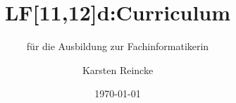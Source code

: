 \documentclass[]{beamer}
\title{LF[11,12]d:Curriculum}
\subtitle{für die Ausbildung zur Fachinformatikerin}
\institute{GS-LDK}
\author{Karsten Reincke}
\date{\today}
\def\cfgGl{../../../cfg.gl/}
\begin{document}

\begin{frame}
  \titlepage
\end{frame}








\logo{}
\newpage



%
\end{document}
